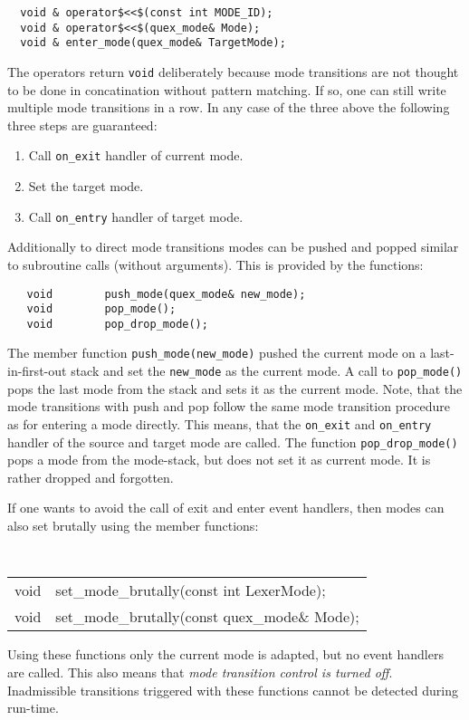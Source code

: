 \begin{lstlisting}
  void & operator$<<$(const int MODE_ID);     
  void & operator$<<$(quex_mode& Mode);      
  void & enter_mode(quex_mode& TargetMode);
\end{lstlisting}

The operators return {\tt void} deliberately because mode transitions are not
thought to be done in concatination without pattern matching. If so, one can
still write multiple mode transitions in a row. In any case of the three above
the following three steps are guaranteed:

\begin{enumerate}
  \item Call {\tt on\_exit} handler of current mode.
  \item Set the target mode.
  \item Call {\tt on\_entry} handler of target mode.
\end{enumerate}

Additionally to direct mode transitions modes can be pushed and popped similar
to subroutine calls (without arguments). This is provided by the functions:

\begin{lstlisting}
   void        push_mode(quex_mode& new_mode); 
   void        pop_mode(); 
   void        pop_drop_mode(); 
\end{lstlisting}

The member function {\tt push\_mode(new\_mode)} pushed the current mode on a
last-in-first-out stack and set the {\tt new\_mode} as the current mode.  A
call to {\tt pop\_mode()} pops the last mode from the stack and sets it as the
current mode. Note, that the mode transitions with push and pop follow the
same mode transition procedure as for entering a mode directly. This means,
that the {\tt on\_exit} and {\tt on\_entry} handler of the source and 
target mode are called. The function {\tt pop\_drop\_mode()} pops
a mode from the mode-stack, but does not set it as current mode. It is
rather dropped and forgotten.

If one wants to avoid the call of exit and enter event handlers, then
modes can also set brutally using the member functions:

{\tt
\begin{tabular}{ll}
  void & set\_mode\_brutally(const int        LexerMode); \\
  void & set\_mode\_brutally(const quex\_mode\& Mode);    \\
\end{tabular}
}

Using these functions only the current mode is adapted, but no event handlers
are called. This also means that {\it mode transition control is turned off}.
Inadmissible transitions triggered with these functions cannot be detected
during run-time.


